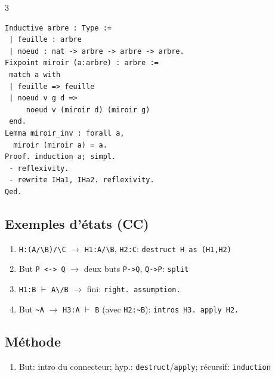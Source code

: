 \documentclass[12pt, a4paper]{article}
\newcommand{\vd}{\vdash}
\begin{document}
\begin{multicols*}{3}
\begin{verbatim}
Inductive arbre : Type :=
 | feuille : arbre
 | noeud : nat -> arbre -> arbre -> arbre.
Fixpoint miroir (a:arbre) : arbre :=
 match a with
 | feuille => feuille
 | noeud v g d =>
     noeud v (miroir d) (miroir g)
 end.
Lemma miroir_inv : forall a,
  miroir (miroir a) = a.
Proof. induction a; simpl.
 - reflexivity.
 - rewrite IHa1, IHa2. reflexivity.
Qed.
\end{verbatim}

	\subsection{Exemples d'états (CC)}
	\begin{enumerate}[\roman*.]
		\item \texttt{H:(A/\textbackslash B)/\textbackslash C} $\to$ \texttt{H1:A/\textbackslash B}, \texttt{H2:C}: \texttt{destruct H as (H1,H2)}
		\item But \texttt{P <-> Q} $\to$ deux buts \texttt{P->Q}, \texttt{Q->P}: \texttt{split}
		\item \texttt{H1:B} $\vd$ \texttt{A\textbackslash/B} $\to$ fini: \texttt{right. assumption.}
		\item But \texttt{\~{}A} $\to$ \texttt{H3:A} $\vd$ \texttt{B} (avec \texttt{H2:\~{}B}): \texttt{intros H3. apply H2.}
	\end{enumerate}

	\subsection{Méthode}
	\begin{enumerate}[\roman*.]
		\item But: intro du connecteur; hyp.: \texttt{destruct}/\texttt{apply}; récursif: \texttt{induction}
	\end{enumerate}


\end{multicols*}
\end{document}

